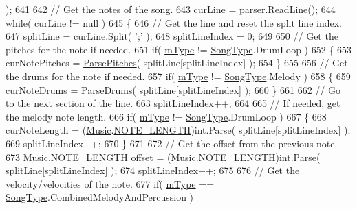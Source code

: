 \begin{DoxyCode}
      );
641 
642         \textcolor{comment}{// Get the notes of the song.}
643         curLine = parser.ReadLine();
644         \textcolor{keywordflow}{while}( curLine != null )
645         \{
646             \textcolor{comment}{// Get the line and reset the split line index.}
647             splitLine = curLine.Split( \textcolor{charliteral}{';'} );
648             splitLineIndex = 0;
649 
650             \textcolor{comment}{// Get the pitches for the note if needed.}
651             \textcolor{keywordflow}{if}( \hyperlink{group___song_priv_var_gaf3b9d0f461522324f897b746311b43c5}{mType} != \hyperlink{group___song_enums_gae681a1f001333e39fc1cb4fea97bfe1b}{SongType}.DrumLoop )
652             \{
653                 curNotePitches = \hyperlink{group___song_priv_func_gacf6fee93921e1a5edbc477c0898c357a}{ParsePitches}( splitLine[splitLineIndex] );
654             \}
655 
656             \textcolor{comment}{// Get the drums for the note if needed.}
657             \textcolor{keywordflow}{if}( \hyperlink{group___song_priv_var_gaf3b9d0f461522324f897b746311b43c5}{mType} != \hyperlink{group___song_enums_gae681a1f001333e39fc1cb4fea97bfe1b}{SongType}.Melody )
658             \{
659                 curNoteDrums = \hyperlink{group___song_priv_func_gaaa4ca12f0885a34cbfb09bb7a1db178b}{ParseDrums}( splitLine[splitLineIndex] );
660             \}
661 
662             \textcolor{comment}{// Go to the next section of the line.}
663             splitLineIndex++;
664 
665             \textcolor{comment}{// If needed, get the melody note length.}
666             \textcolor{keywordflow}{if}( \hyperlink{group___song_priv_var_gaf3b9d0f461522324f897b746311b43c5}{mType} != \hyperlink{group___song_enums_gae681a1f001333e39fc1cb4fea97bfe1b}{SongType}.DrumLoop )
667             \{
668                 curNoteLength = (\hyperlink{class_music}{Music}.\hyperlink{group___music_enums_gaf11b5f079adbb21c800b9eca1c5c3cbd}{NOTE\_LENGTH})\textcolor{keywordtype}{int}.Parse( splitLine[splitLineIndex] );
669                 splitLineIndex++;
670             \}
671 
672             \textcolor{comment}{// Get the offset from the previous note.}
673             \hyperlink{class_music}{Music}.\hyperlink{group___music_enums_gaf11b5f079adbb21c800b9eca1c5c3cbd}{NOTE\_LENGTH} offset = (\hyperlink{class_music}{Music}.\hyperlink{group___music_enums_gaf11b5f079adbb21c800b9eca1c5c3cbd}{NOTE\_LENGTH})\textcolor{keywordtype}{int}.Parse( 
      splitLine[splitLineIndex] );
674             splitLineIndex++;
675 
676             \textcolor{comment}{// Get the velocity/velocities of the note.}
677             \textcolor{keywordflow}{if}( \hyperlink{group___song_priv_var_gaf3b9d0f461522324f897b746311b43c5}{mType} == \hyperlink{group___song_enums_gae681a1f001333e39fc1cb4fea97bfe1b}{SongType}.CombinedMelodyAndPercussion )

\end{DoxyCode}
